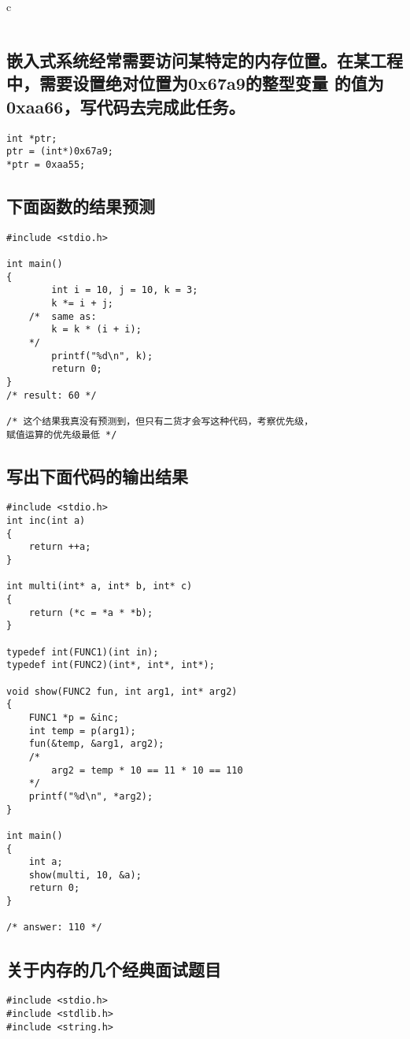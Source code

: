 \documentclass{article}
\begin{document}
\begin{mitned}{c}
\begin{verbatim}
\end{verbatim}

\subsection{嵌入式系统经常需要访问某特定的内存位置。在某工程中，需要设置绝对位置为0x67a9的整型变量
的值为0xaa66，写代码去完成此任务。}
\begin{verbatim}
int *ptr;
ptr = (int*)0x67a9;
*ptr = 0xaa55;
\end{verbatim}

\subsection{下面函数的结果预测}
\begin{verbatim}
#include <stdio.h>

int main()
{
        int i = 10, j = 10, k = 3;
        k *= i + j;
	/*	same as:
		k = k * (i + i);
	*/
        printf("%d\n", k); 
        return 0;
}
/* result: 60 */

/* 这个结果我真没有预测到，但只有二货才会写这种代码，考察优先级，
赋值运算的优先级最低 */
\end{verbatim}

\subsection{写出下面代码的输出结果}

\begin{verbatim}
#include <stdio.h>
int inc(int a)
{
	return ++a;
}

int multi(int* a, int* b, int* c)
{
	return (*c = *a * *b);
}

typedef int(FUNC1)(int in);
typedef int(FUNC2)(int*, int*, int*);

void show(FUNC2 fun, int arg1, int* arg2)
{
	FUNC1 *p = &inc;
	int temp = p(arg1);
	fun(&temp, &arg1, arg2);
	/*
		arg2 = temp * 10 == 11 * 10 == 110
	*/
	printf("%d\n", *arg2);
}

int main()
{
	int a;
	show(multi, 10, &a);
	return 0;
}

/* answer: 110 */

\end{verbatim}

\subsection{关于内存的几个经典面试题目}
\begin{verbatim}
#include <stdio.h>
#include <stdlib.h>
#include <string.h>


\end{verbatim}
\end{mitned}
\end{document}
